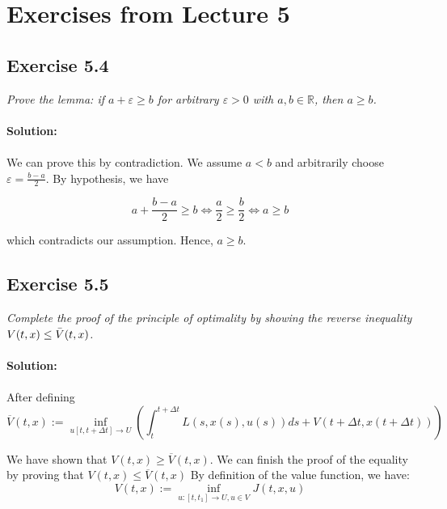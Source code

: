 \section{Exercises from Lecture 5}

\subsection{Exercise 5.4}

\emph{Prove the lemma: if $a + \varepsilon \geq b$ for arbitrary $\varepsilon > 0$ with $a, b \in \mathbb{R}$, then $a \geq b$.}
\\
\\
\textbf{Solution:}\\
\\
We can prove this by contradiction. We assume $a < b$ and arbitrarily choose $\varepsilon = \frac{b-a}{2}$. By hypothesis, we have

\begin{equation}
    a + \frac{b-a}{2} \geq b \iff \frac{a}{2} \geq \frac{b}{2} \iff a \geq b
\end{equation}

which contradicts our assumption. Hence, $a \geq b$.
\QEDB

\subsection{Exercise 5.5}
\emph{Complete the proof of the principle of optimality by showing the reverse inequality $V(t,x) \leq \Bar{V}(t,x)$.}
\\
\\
\textbf{Solution:}\\
\\
After defining 
\begin{equation}
    \overline{V}(t,x) := \inf_{u[t, t+\Delta t] \to U} \left( \int_t^{t + \Delta t} L(s, x(s), u(s))ds + V(t + \Delta t, x(t + \Delta t)) \right)
\end{equation}

We have shown that $V(t,x) \geq \overline{V}(t,x)$. We can finish the proof of the equality by proving that $V(t,x) \leq \overline{V}(t,x)$  By definition of the value function, we have:
\begin{equation}
    V(t,x) := \inf_{u:[t, t_1]\to U, u \in V} J(t,x,u)
\end{equation}

